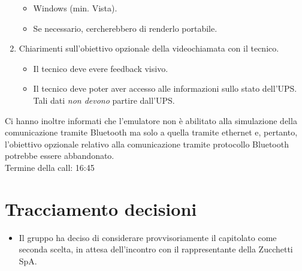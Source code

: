 \begin{enumerate}
    \begin{itemize}
        \item Windows (min. Vista).
        \item Se necessario, cercherebbero di renderlo portabile.
    \end{itemize}
    \item Chiarimenti sull'obiettivo opzionale della videochiamata con il tecnico.
    \begin{itemize}
        \item Il tecnico deve evere feedback visivo.
        \item Il tecnico deve poter aver accesso alle informazioni sullo stato dell'UPS. Tali dati \emph{non devono} partire dall'UPS.
    \end{itemize}
\end{enumerate}
Ci hanno inoltre informati che l'emulatore non è abilitato alla simulazione della comunicazione tramite Bluetooth ma solo a quella tramite ethernet e, pertanto, l'obiettivo opzionale relativo alla comunicazione tramite protocollo Bluetooth potrebbe essere abbandonato.\\
Termine della call: 16:45

\section{Tracciamento decisioni}
\begin{itemize}
    \item Il gruppo ha deciso di considerare provvisoriamente il capitolato come seconda scelta, in attesa dell'incontro con il rappresentante della Zucchetti SpA.
\end{itemize}
